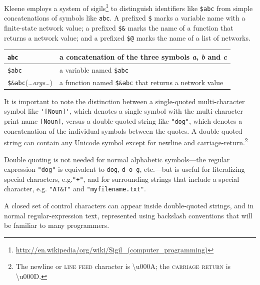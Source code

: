 \documentclass[letterpaper,12pt]{article}
\newcommand{\Kleene}{Kleene\xspace}
\newcommand{\acro}{\textsc}
\begin{document}
\Kleene{} employs a system of
sigils\footnote{\url{http://en.wikipedia/org/wiki/Sigil_(computer_programming)}}
to distinguish identifiers like \verb!$abc! from simple concatenations of symbols 
like \verb!abc!.  A prefixed
\verb!$! marks a variable name with a finite-state network value; a prefixed
\verb!$&! marks the
name of a function that returns a network value; and a prefixed \verb!$@! marks the name of
a list of networks.

\vspace{0.5cm} 

\begin{center}
\begin{tabular}{|l|l|}
\hline
\verb!abc! & a concatenation of the three symbols \emph{a}, \emph{b} and \emph{c} \\
\hline
\verb!$abc! & a variable named \verb!$abc! \\
\hline
\verb!$&abc!(\ldots{}\textit{args}\ldots{}) & a function named
\verb!$&abc! that returns a network value\\
\hline
\end{tabular}
\end{center}

\vspace{0.5cm}

It is important to note the distinction between a single-quoted
multi-character symbol like \verb!'[Noun]'!, which denotes a single
symbol with the multi-character print name \verb![Noun]!, versus a
double-quoted string like \verb!"dog"!, which denotes a concatenation of
the individual symbols between the quotes. A double-quoted string can
contain any Unicode symbol except for newline and
carriage-return.\footnote{The newline or \acro{line feed} character is
\textbackslash{}u000A; the \acro{carriage return} is
\textbackslash{}u000D.}

Double quoting is not needed for
normal alphabetic symbols---the regular expression \verb!"dog"! is
equivalent to \verb!dog!, \verb!d o g!, etc.---but
is useful for literalizing special characters, e.g.\@ \verb!"+"!, and for
surrounding strings that include a special character, e.g.\@
\verb!"AT&T"! and \verb!"myfilename.txt"!.

A closed set of control characters can appear inside double-quoted strings,
and in normal regular-expression text,
represented using backslash conventions that will be familiar to many
programmers.

\vspace{0.5cm} 
\end{document}
